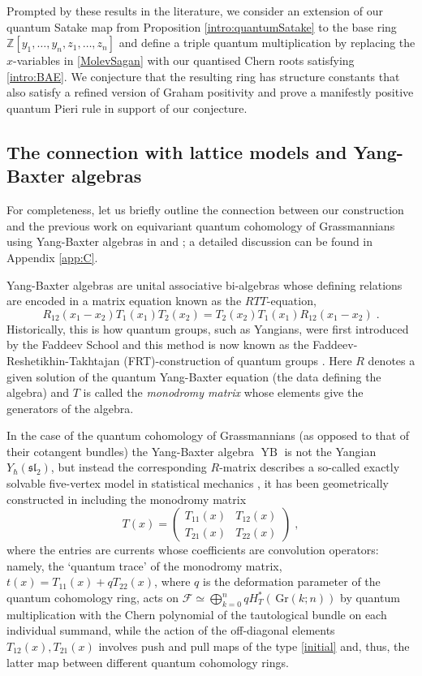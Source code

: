\documentclass[12pt]{amsart}
\newcommand{\Z}{\mathbb{Z}}
\newcommand{\Gr}{\,\mathrm{Gr}}
\newcommand{\mc}[1]{\mathcal{#1}}
\newcommand{\mf}[1]{\mathfrak{#1}}
\numberwithin{equation}{section}
\numberwithin{figure}{section}
\newcommand{\YB}{\operatorname{YB}}
\begin{document}
Prompted by these results in the literature, we consider an extension of our quantum Satake map from Proposition \ref{intro:quantumSatake} to the base ring $\Z[y_1,\ldots,y_n,z_1,\ldots,z_n]$ and define a triple quantum multiplication by replacing the $x$-variables in \eqref{MolevSagan} with our quantised Chern roots satisfying \eqref{intro:BAE}. We conjecture that the resulting ring has structure constants that also satisfy a refined version of Graham positivity and prove a manifestly positive quantum Pieri rule in support of our conjecture.

\subsection{The connection with lattice models and Yang-Baxter algebras}
For completeness, let us briefly outline the connection between our construction and the previous work on equivariant quantum cohomology of Grassmannians using Yang-Baxter algebras in \cite{gorbounovkorff2014} and \cite{GKS20}; a detailed discussion can be found in Appendix \ref{app:C}.

Yang-Baxter algebras are unital associative bi-algebras whose defining relations are encoded in a matrix equation known as the $RTT$-equation,
\[
R_{12}(x_1 - x_2)T_1(x_1) T_2(x_2) = T_2(x_2) T_1(x_1) R_{12}(x_1 - x_2)\;.
\]
Historically, this is how quantum groups, such as Yangians, were first introduced by the Faddeev School and this method is now known as the Faddeev-Reshetikhin-Takhtajan (FRT)-construction of quantum groups \cite{faddeev1988quantization,faddeev1990lectures}. Here $R$ denotes a given solution of the quantum Yang-Baxter equation (the data defining the algebra) and $T$ is called the {\em monodromy matrix} whose elements give the generators of the algebra. 

In the case of the quantum cohomology of Grassmannians (as opposed to that of their cotangent bundles) the Yang-Baxter algebra $\YB$ is not the Yangian $Y_\hbar(\mf{sl}_2)$, but instead the corresponding $R$-matrix describes a so-called exactly solvable five-vertex model in statistical mechanics \cite{korff2014quantum,gorbounovkorff2014}, it has been geometrically constructed in \cite{GKS20} including the monodromy matrix
\begin{equation} \label{monodromy}
    T(x) = \begin{pmatrix}
        T_{11}(x) & T_{12}(x) \\
        T_{21}(x) & T_{22}(x)
    \end{pmatrix}\;,
\end{equation}
where the entries are currents whose coefficients are convolution operators: namely, the `quantum trace' of the monodromy matrix, $t(x)= T_{11}(x) + q T_{22}(x)$, where $q$ is the deformation parameter of the quantum cohomology ring, acts on $\mc{F}\simeq \bigoplus_{k=0}^nqH_T^*(\Gr(k;n))$ by quantum multiplication with the Chern polynomial of the tautological bundle on each individual summand, while the action of the off-diagonal elements $T_{12}(x),T_{21}(x)$ involves push and pull maps of the type \eqref{initial} and, thus, the latter map between different quantum cohomology rings. 
\end{document}
